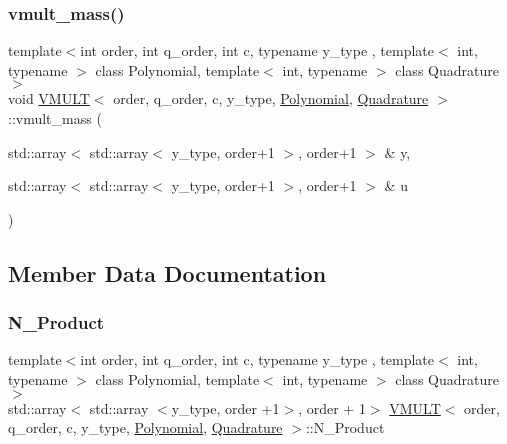 \mbox{\label{class_v_m_u_l_t_ab903e1707daffaf5480c481281f419db}} 
\subsubsection{\texorpdfstring{vmult\+\_\+mass()}{vmult\_mass()}}
{\footnotesize\ttfamily template$<$int order, int q\+\_\+order, int c, typename y\+\_\+type , template$<$ int, typename $>$ class Polynomial, template$<$ int, typename $>$ class Quadrature$>$ \\
void \hyperlink{class_v_m_u_l_t}{V\+M\+U\+LT}$<$ order, q\+\_\+order, c, y\+\_\+type, \hyperlink{class_polynomial}{Polynomial}, \hyperlink{class_quadrature}{Quadrature} $>$\+::vmult\+\_\+mass (\begin{DoxyParamCaption}\item[{std\+::array$<$ std\+::array$<$ y\+\_\+type, order+1 $>$, order+1 $>$ \&}]{y,  }\item[{std\+::array$<$ std\+::array$<$ y\+\_\+type, order+1 $>$, order+1 $>$ \&}]{u }\end{DoxyParamCaption})\hspace{0.3cm}{\ttfamily [inline]}}



\subsection{Member Data Documentation}
\mbox{\label{class_v_m_u_l_t_a1997e77da014ab5ee4b2c13670845599}} 
\subsubsection{\texorpdfstring{N\+\_\+\+Product}{N\_Product}}
{\footnotesize\ttfamily template$<$int order, int q\+\_\+order, int c, typename y\+\_\+type , template$<$ int, typename $>$ class Polynomial, template$<$ int, typename $>$ class Quadrature$>$ \\
std\+::array$<$ std\+::array $<$y\+\_\+type, order +1$>$, order + 1$>$ \hyperlink{class_v_m_u_l_t}{V\+M\+U\+LT}$<$ order, q\+\_\+order, c, y\+\_\+type, \hyperlink{class_polynomial}{Polynomial}, \hyperlink{class_quadrature}{Quadrature} $>$\+::N\+\_\+\+Product}

